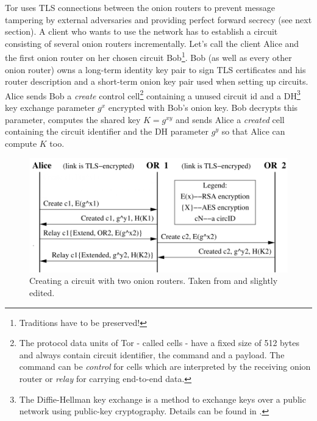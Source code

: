 Tor uses TLS connections between the onion routers to prevent message tampering by external adversaries and providing perfect forward secrecy (see next section). A client who wants to use the network has to establish a circuit consisting of several onion routers incrementally. Let's call the client Alice and the first onion router on her chosen circuit Bob\footnote{
	Traditions have to be preserved!
}. Bob (as well as every other onion router) owns a long-term identity key pair to sign TLS certificates and his router description and a short-term onion key pair used when setting up circuits. \\ Alice sends Bob a \textit{create} control cell\footnote{
	The protocol data units of Tor - called cells - have a fixed size of 512 bytes and always contain circuit identifier, the command and a payload. The command can be \textit{control} for cells which are interpreted by the receiving onion router or \textit{relay} for carrying end-to-end data.
} containing a unused circuit id and a DH\footnote{
	The Diffie-Hellman key exchange is a method to exchange keys over a public network using public-key cryptography. Details can be found in \cite{diffie1976new}.
} key exchange parameter \(g^x\) encrypted with Bob's onion key. Bob decrypts this parameter, computes the shared key \(K = g^{xy}\) and sends Alice a \textit{created} cell containing the circuit identifier and the DH parameter \(g^y\) so that Alice can compute \(K\) too.

\begin{figure}
	\includegraphics[width=\columnwidth]{img/circuit_creation.png}
	\caption{Creating a circuit with two onion routers. Taken from \cite{tor2004original} and slightly edited.}
	\label{img_circuit_creation}
\end{figure}

